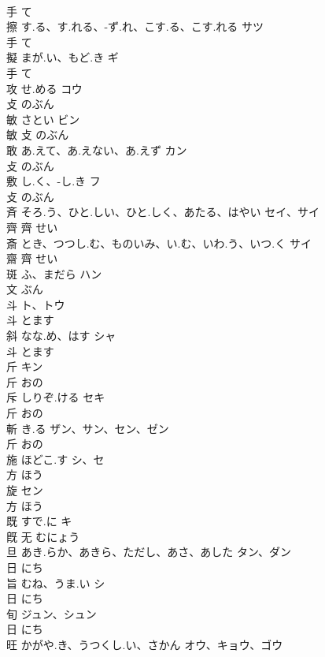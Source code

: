 \documentclass[8pt]{extreport}
\begin{document}
\begin{CJK}{UTF8}{min}
\\	手		て		
\\	擦	す.る、す.れる、-ず.れ、こす.る、こす.れる	サツ	
\\	手		て		
\\	擬	まが.い、もど.き	ギ	
\\	手		て		
\\	攻	せ.める	コウ	
\\	攴		のぶん		
\\	敏	さとい	ビン	
\\	敏	攴		のぶん		
\\	敢	あ.えて、あ.えない、あ.えず	カン	
\\	攴		のぶん		
\\	敷	し.く、-し.き	フ	
\\	攴		のぶん		
\\	斉	そろ.う、ひと.しい、ひと.しく、あたる、はやい	セイ、サイ	
\\	齊	齊		せい		
\\	斎	とき、つつし.む、ものいみ、い.む、いわ.う、いつ.く	サイ	
\\	齋	齊		せい		
\\	斑	ふ、まだら	ハン	
\\	文		ぶん		
\\	斗		ト、トウ	
\\	斗		とます		
\\	斜	なな.め、はす	シャ	
\\	斗		とます		
\\	斤		キン	
\\	斤		おの		
\\	斥	しりぞ.ける	セキ	
\\	斤		おの		
\\	斬	き.る	ザン、サン、セン、ゼン	
\\	斤		おの		
\\	施	ほどこ.す	シ、セ	
\\	方		ほう		
\\	旋		セン	
\\	方		ほう		
\\	既	すで.に	キ	
\\	既	无		むにょう		
\\	旦	あき.らか、あきら、ただし、あさ、あした	タン、ダン	
\\	日		にち		
\\	旨	むね、うま.い	シ	
\\	日		にち		
\\	旬		ジュン、シュン	
\\	日		にち		
\\	旺	かがや.き、うつくし.い、さかん	オウ、キョウ、ゴウ	

\end{CJK}
\end{document}
